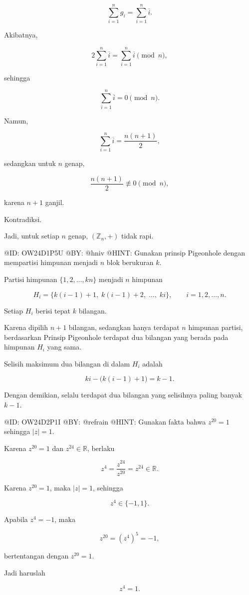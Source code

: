 $$
\sum_{i=1}^n g_i
=
\sum_{i=1}^n\overline{i}.
$$

Akibatnya,

$$
2\sum_{i=1}^n\overline{i}
=
\sum_{i=1}^n\overline{i}
\pmod n,
$$

sehingga

$$
\sum_{i=1}^n\overline{i}
=
0
\pmod n.
$$

Namun,

$$
\sum_{i=1}^n\overline{i}
=
\frac{n(n+1)}2,
$$

sedangkan untuk $n$ genap,

$$
\frac{n(n+1)}2
\not\equiv0
\pmod n,
$$

karena $n+1$ ganjil.

Kontradiksi.

Jadi, untuk setiap $n$ genap, $(\mathbb Z_n,+)$ tidak rapi.


@ID: OW24D1P5U
@BY: @hniv
@HINT: Gunakan prinsip Pigeonhole dengan mempartisi himpunan menjadi $n$ blok berukuran $k$.

Partisi himpunan $\{1,2,\ldots,kn\}$ menjadi $n$ himpunan

$$
H_i=\{k(i-1)+1,\;k(i-1)+2,\;\ldots,\;ki\},
\qquad i=1,2,\ldots,n.
$$

Setiap $H_i$ berisi tepat $k$ bilangan.

Karena dipilih $n+1$ bilangan, sedangkan hanya terdapat $n$ himpunan partisi, berdasarkan Prinsip Pigeonhole terdapat dua bilangan yang berada pada himpunan $H_i$ yang sama.

Selisih maksimum dua bilangan di dalam $H_i$ adalah

$$
ki-\bigl(k(i-1)+1\bigr)=k-1.
$$

Dengan demikian, selalu terdapat dua bilangan yang selisihnya paling banyak $k-1$.

@ID: OW24D2P1I
@BY: @refrain
@HINT: Gunakan fakta bahwa $z^{20}=1$ sehingga $|z|=1$.

Karena $z^{20}=1$ dan $z^{24}\in\mathbb R$, berlaku

$$
z^4=\frac{z^{24}}{z^{20}}=z^{24}\in\mathbb R.
$$

Karena $z^{20}=1$, maka $|z|=1$, sehingga

$$
z^4\in\{-1,1\}.
$$

Apabila $z^4=-1$, maka

$$
z^{20}=(z^4)^5=-1,
$$

bertentangan dengan $z^{20}=1$.

Jadi haruslah

$$
z^4=1.
$$

